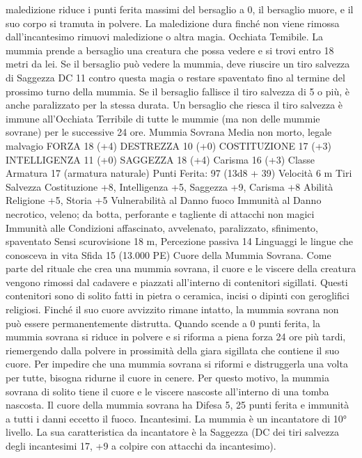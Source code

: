 \begin{multicols}{2}
maledizione riduce i punti ferita massimi del bersaglio a 0, il
bersaglio muore, e il suo corpo si tramuta in polvere. La
maledizione dura finché non viene rimossa dall’incantesimo
rimuovi maledizione o altra magia.
Occhiata Temibile. La mummia prende a bersaglio una creatura
che possa vedere e si trovi entro 18 metri da lei. Se il bersaglio
può vedere la mummia, deve riuscire un tiro salvezza di
Saggezza DC 11 contro questa magia o restare spaventato fino al
termine del prossimo turno della mummia. Se il bersaglio fallisce
il tiro salvezza di 5 o più, è anche paralizzato per la stessa durata.
Un bersaglio che riesca il tiro salvezza è immune all’Occhiata
Terribile di tutte le mummie (ma non delle mummie sovrane) per
le successive 24 ore.
Mummia Sovrana
Media non morto, legale malvagio
FORZA 18 (+4)
DESTREZZA 10 (+0)
COSTITUZIONE 17 (+3)
INTELLIGENZA 11 (+0)
SAGGEZZA 18 (+4)
Carisma 16 (+3)
Classe Armatura 17 (armatura naturale)
\hspace*{0pt}\hfill{Punti Ferita}: 97 (13d8 + 39)
Velocità 6 m
Tiri Salvezza Costituzione +8, Intelligenza +5, Saggezza +9,
Carisma +8
Abilità Religione +5, Storia +5
Vulnerabilità al Danno fuoco
Immunità al Danno necrotico, veleno; da botta, perforante
e tagliente di attacchi non magici
Immunità alle Condizioni affascinato, avvelenato, paralizzato,
sfinimento, spaventato
Sensi scurovisione 18 m, Percezione passiva 14
Linguaggi le lingue che conosceva in vita
Sfida 15 (13.000 PE)
Cuore della Mummia Sovrana. Come parte del rituale che crea
una mummia sovrana, il cuore e le viscere della creatura
vengono rimossi dal cadavere e piazzati all’interno di contenitori
sigillati. Questi contenitori sono di solito fatti in pietra o
ceramica, incisi o dipinti con geroglifici religiosi.
Finché il suo cuore avvizzito rimane intatto, la mummia sovrana
non può essere permanentemente distrutta. Quando scende a 0
punti ferita, la mummia sovrana si riduce in polvere e si riforma
a piena forza 24 ore più tardi, riemergendo dalla polvere in
prossimità della giara sigillata che contiene il suo cuore. Per
impedire che una mummia sovrana si riformi e distruggerla una
volta per tutte, bisogna ridurne il cuore in cenere. Per questo
motivo, la mummia sovrana di solito tiene il cuore e le viscere
nascoste all’interno di una tomba nascosta.
Il cuore della mummia sovrana ha Difesa 5, 25 punti ferita e
immunità a tutti i danni eccetto il fuoco.
Incantesimi. La mummia è un incantatore di 10° livello. La sua
caratteristica da incantatore è la Saggezza (DC dei tiri salvezza
degli incantesimi 17, +9 a colpire con attacchi da incantesimo).

\end{multicols}
